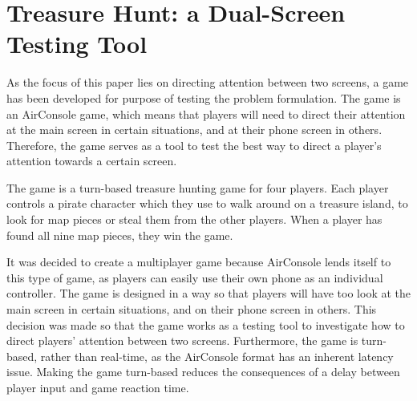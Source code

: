 \chapter{Treasure Hunt: a Dual-Screen Testing Tool}\label{ch:game}
 As the focus of this paper lies on directing attention between two screens, a game has been developed for purpose of testing the problem formulation. The game is an AirConsole game, which means that players will need to direct their attention at the main screen in certain situations, and at their phone screen in others. Therefore, the game serves as a tool to test the best way to direct a player's attention towards a certain screen.

The game is a turn-based treasure hunting game for four players. Each player controls a pirate character which they use to walk around on a treasure island, to look for map pieces or steal them from the other players. When a player has found all nine map pieces, they win the game.

It was decided to create a multiplayer game because AirConsole lends itself to this type of game, as players can easily use their own phone as an individual controller. The game is designed in a way so that players will have too look at the main screen in certain situations, and on their phone screen in others. This decision was made so that the game works as a testing tool to investigate how to direct players' attention between two screens. Furthermore, the game is turn-based, rather than real-time, as the AirConsole format has an inherent latency issue. Making the game turn-based reduces the consequences of a delay between player input and game reaction time. 


